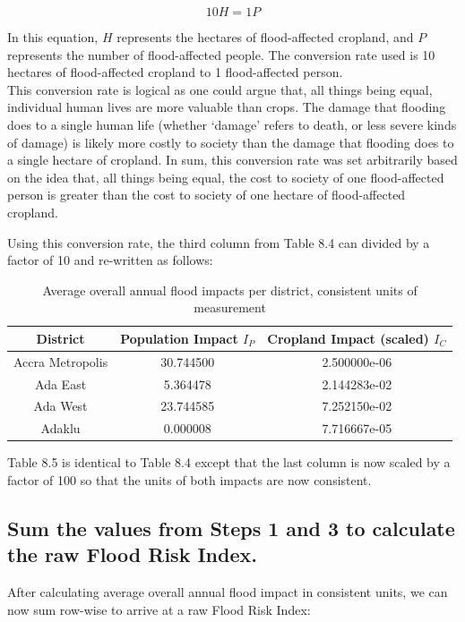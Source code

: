 \[ 10{H} = 1{P} \]

In this equation, \({H}\) represents the hectares of flood-affected cropland, and \({P}\) represents the number of flood-affected people. The conversion rate used is 10 hectares of flood-affected cropland to 1 flood-affected person.\\

This conversion rate is logical as one could argue that, all things being equal, individual human lives are more valuable than crops. The damage that flooding does to a single human life (whether ‘damage’ refers to death, or less severe kinds of damage) is likely more costly to society than the damage that flooding does to a single hectare of cropland. In sum, this conversion rate was set arbitrarily based on the idea that, all things being equal, the cost to society of one flood-affected person is greater than the cost to society of one hectare of flood-affected cropland.

Using this conversion rate, the third column from Table 8.4 can divided by a factor of 10 and re-written as follows:

\begin{table}
\centering
\begin{tabular}{|c|c|c|}
\hline
\textbf{District} & \textbf{Population Impact \({I_P}\)} & \textbf{Cropland Impact (scaled) \({I_C}\)}\\
\hline
Accra Metropolis\rule{0pt}{4ex} & 30.744500 & 2.500000e-06\\
Ada East\rule{0pt}{4ex} & 5.364478 & 2.144283e-02\\
Ada West\rule{0pt}{4ex} & 23.744585 & 7.252150e-02\\
Adaklu\rule{0pt}{4ex} & 0.000008 & 7.716667e-05\\
\hline
\end{tabular}
\caption{Average overall annual flood impacts per district, consistent units of measurement}
\end{table}

Table 8.5 is identical to Table 8.4 except that the last column is now scaled by a factor of 100 so that the units of both impacts are now consistent.

\subsection{Sum the values from Steps 1 and 3 to calculate the raw Flood Risk Index.}

After calculating average overall annual flood impact in consistent units, we can now sum row-wise to arrive at a raw Flood Risk Index:

